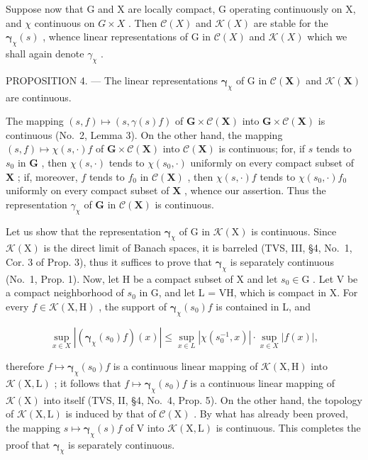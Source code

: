 Suppose now that G and X are locally compact, G operating continuously on X, and \(\chi\) continuous on \(G \times X\) . Then \(\mathcal{C}(X)\) and \(\mathcal{K}(X)\) are stable for the \(\boldsymbol{\gamma}_{\chi}(s)\) , whence linear representations of G in \(\mathcal{C}(X)\) and \(\mathcal{K}(X)\) which we shall again denote \(\gamma_{\chi}\) .

PROPOSITION 4. --- The linear representations \(\pmb{\gamma}_{\chi}\) of G in \(\mathcal{C}(\mathbf{X})\) and \(\mathcal{K}(\mathbf{X})\) are continuous.

The mapping \((s, f) \mapsto (s, \gamma(s)f)\) of \(\mathbf{G} \times \mathcal{C}(\mathbf{X})\) into \(\mathbf{G} \times \mathcal{C}(\mathbf{X})\) is continuous (No.~2, Lemma 3). On the other hand, the mapping \((s, f) \mapsto \chi(s, \cdot)f\) of \(\mathbf{G} \times \mathcal{C}(\mathbf{X})\) into \(\mathcal{C}(\mathbf{X})\) is continuous; for, if \(s\) tends to \(s_0\) in \(\mathbf{G}\) , then \(\chi(s, \cdot)\) tends to \(\chi(s_0, \cdot)\) uniformly on every compact subset of \(\mathbf{X}\) ; if, moreover, \(f\) tends to \(f_0\) in \(\mathcal{C}(\mathbf{X})\) , then \(\chi(s, \cdot)f\) tends to \(\chi(s_0, \cdot)f_0\) uniformly on every compact subset of \(\mathbf{X}\) , whence our assertion. Thus the representation \(\gamma_{\chi}\) of \(\mathbf{G}\) in \(\mathcal{C}(\mathbf{X})\) is continuous.

Let us show that the representation \(\pmb{\gamma}_{\chi}\) of G in \(\mathcal{K}(\mathrm{X})\) is continuous. Since \(\mathcal{K}(\mathrm{X})\) is the direct limit of Banach spaces, it is barreled (TVS, III, §4, No.~1, Cor. 3 of Prop. 3), thus it suffices to prove that \(\pmb{\gamma}_{\chi}\) is separately continuous (No.~1, Prop. 1). Now, let H be a compact subset of X and let \(s_0 \in \mathrm{G}\) . Let V be a compact neighborhood of \(s_0\) in G, and let L = VH, which is compact in X. For every \(f \in \mathcal{K}(\mathrm{X}, \mathrm{H})\) , the support of \(\pmb{\gamma}_{\chi}(s_0)f\) is contained in L, and

\[
\sup _ {x \in X} | (\boldsymbol {\gamma} _ {\chi} (s _ {0}) f) (x) | \leqslant \sup _ {x \in L} | \chi (s _ {0} ^ {- 1}, x) | \cdot \sup _ {x \in X} | f (x) |,
\]

therefore \(f \mapsto \boldsymbol{\gamma}_{\chi}(s_0)f\) is a continuous linear mapping of \(\mathcal{K}(\mathrm{X},\mathrm{H})\) into \(\mathcal{K}(\mathrm{X},\mathrm{L})\) ; it follows that \(f \mapsto \boldsymbol{\gamma}_{\chi}(s_0)f\) is a continuous linear mapping of \(\mathcal{K}(\mathrm{X})\) into itself (TVS, II, §4, No.~4, Prop. 5). On the other hand, the topology of \(\mathcal{K}(\mathrm{X},\mathrm{L})\) is induced by that of \(\mathcal{C}(\mathrm{X})\) . By what has already been proved, the mapping \(s \mapsto \boldsymbol{\gamma}_{\chi}(s)f\) of \(\mathrm{V}\) into \(\mathcal{K}(\mathrm{X},\mathrm{L})\) is continuous. This completes the proof that \(\boldsymbol{\gamma}_{\chi}\) is separately continuous.

